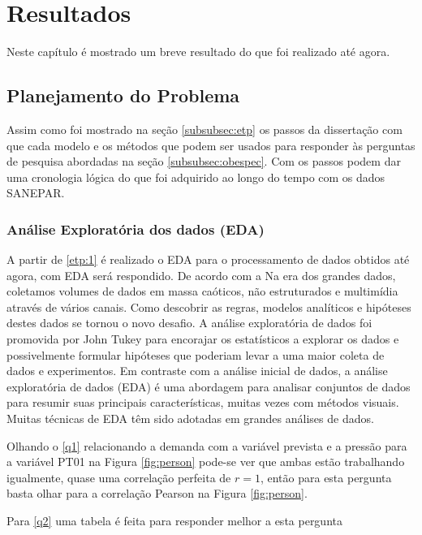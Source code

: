\section{Resultados} \label{sec:result}

Neste capítulo é mostrado um breve resultado do que foi realizado até agora.


\subsection{Planejamento do Problema} \label{subsec:planexp}

Assim como foi mostrado na seção \ref{subsubsec:etp} os passos da dissertação com que cada modelo e os métodos que podem ser usados para responder às perguntas de pesquisa abordadas na seção \ref{subsubsec:obespec}. Com os passos podem dar uma cronologia lógica do que foi adquirido ao longo do tempo com os dados SANEPAR.


\subsubsection{An\'alise Explorat\'oria dos dados (EDA)}

A partir de \ref{etp:1} é realizado o EDA para o processamento de dados obtidos até agora, com EDA será respondido. De acordo com a  Na era dos grandes dados, coletamos volumes de dados em massa caóticos, não estruturados e multimídia através de vários canais. Como descobrir as regras, modelos analíticos e hipóteses destes dados se tornou o novo desafio. A análise exploratória de dados foi promovida por John Tukey para encorajar os estatísticos a explorar os dados e possivelmente formular hipóteses que poderiam levar a uma maior coleta de dados e experimentos. Em contraste com a análise inicial de dados, a análise exploratória de dados (EDA) é uma abordagem para analisar conjuntos de dados para resumir suas principais características, muitas vezes com métodos visuais. Muitas técnicas de EDA têm sido adotadas em grandes análises de dados.

Olhando o \ref{q1} relacionando a demanda com a variável prevista e a pressão para a variável PT01 na Figura \ref{fig:person} pode-se ver que ambas estão trabalhando igualmente, quase uma correlação perfeita de $r=1$, então para esta pergunta basta olhar para a correlação Pearson na Figura \ref{fig:person}. 

Para \ref{q2} uma tabela é feita para responder melhor a esta pergunta



